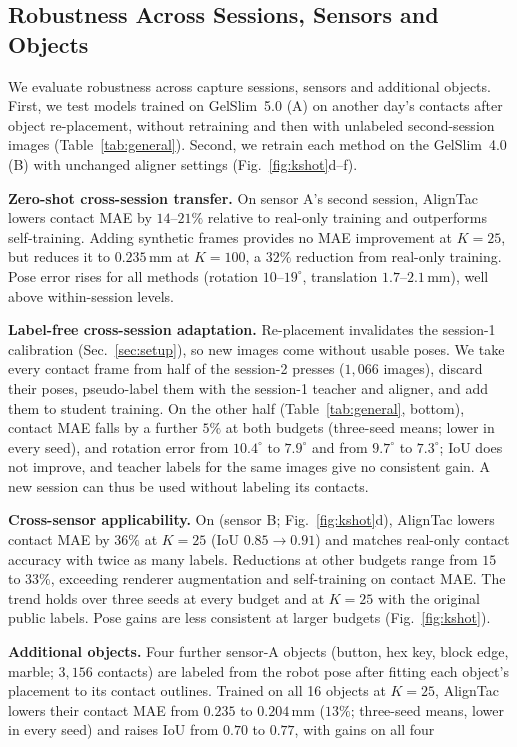 \subsection{Robustness Across Sessions, Sensors and Objects}
\label{sec:general}
We evaluate robustness across capture sessions, sensors and additional objects. First, we test models trained on GelSlim~5.0 (A) on another day's contacts after object re-placement, without retraining and then with unlabeled second-session images (Table~\ref{tab:general}). Second, we retrain each method on the GelSlim~4.0 (B) with unchanged aligner settings (Fig.~\ref{fig:kshot}d--f).

\noindent\textbf{Zero-shot cross-session transfer.} On sensor A's second session, AlignTac lowers contact MAE by $14$--$21\%$ relative to real-only training and outperforms self-training. Adding synthetic frames provides no MAE improvement at $K=25$, but reduces it to $0.235\,$mm at $K=100$, a $32\%$ reduction from real-only training. Pose error rises for all methods (rotation $10$--$19^\circ$, translation $1.7$--$2.1\,$mm), well above within-session levels.

\noindent\textbf{Label-free cross-session adaptation.} Re-placement invalidates the session-1 calibration (Sec.~\ref{sec:setup}), so new images come without usable poses. We take every contact frame from half of the session-2 presses ($1{,}066$ images), discard their poses, pseudo-label them with the session-1 teacher and aligner, and add them to student training. On the other half (Table~\ref{tab:general}, bottom), contact MAE falls by a further $5\%$ at both budgets (three-seed means; lower in every seed), and rotation error from $10.4^\circ$ to $7.9^\circ$ and from $9.7^\circ$ to $7.3^\circ$; IoU does not improve, and teacher labels for the same images give no consistent gain. A new session can thus be used without labeling its contacts.

\noindent\textbf{Cross-sensor applicability.} On \sensorB{} (sensor B; Fig.~\ref{fig:kshot}d), AlignTac lowers contact MAE by $36\%$ at $K=25$ (IoU $0.85\to0.91$) and matches real-only contact accuracy with twice as many labels. Reductions at other budgets range from $15$ to $33\%$, exceeding renderer augmentation and self-training on contact MAE. The trend holds over three seeds at every budget and at $K=25$ with the original public labels. Pose gains are less consistent at larger budgets (Fig.~\ref{fig:kshot}).

\noindent\textbf{Additional objects.} Four further sensor-A objects (button, hex key, block edge, marble; $3{,}156$ contacts) are labeled from the robot pose after fitting each object's placement to its contact outlines. Trained on all 16 objects at $K=25$, AlignTac lowers their contact MAE from $0.235$ to $0.204\,$mm ($13\%$; three-seed means, lower in every seed) and raises IoU from $0.70$ to $0.77$, with gains on all four 

